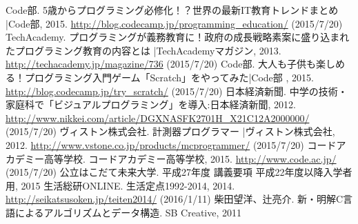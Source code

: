 \documentclass[openany,11pt,papersize]{jsbook}
\begin{document}

\begin{thebibliography}{9}
  Code部. 5歳からプログラミング必修化！？世界の最新IT教育トレンドまとめ |Code部,  2015. \url{http://blog.codecamp.jp/programming_education/} (2015/7/20)
  TechAcademy. プログラミングが義務教育に！政府の成長戦略素案に盛り込まれたプログラミング教育の内容とは |TechAcademyマガジン,  2013. \url{http://techacademy.jp/magazine/736} (2015/7/20)
   Code部. 大人も子供も楽しめる！プログラミング入門ゲーム「Scratch」をやってみた|Code部 ,  2015. \url{http://blog.codecamp.jp/try_scratch/} (2015/7/20)
  日本経済新聞. 中学の技術・家庭科で「ビジュアルプログラミング」を導入:日本経済新聞,  2012. \url{http://www.nikkei.com/article/DGXNASFK2701H_X21C12A2000000/} (2015/7/20)
  ヴィストン株式会社. 計測器プログラマー |ヴィストン株式会社,  2012. \url{http://www.vstone.co.jp/products/mcprogrammer/} (2015/7/20)
   コードアカデミー高等学校. コードアカデミー高等学校,  2015. \url{http://www.code.ac.jp/} (2015/7/20)
 公立はこだて未来大学. 平成27年度 講義要項 平成22年度以降入学者用,  2015
   生活総研ONLINE. 生活定点1992-2014,  2014. \url{http://seikatsusoken.jp/teiten2014/} (2016/1/11)
   柴田望洋、辻亮介. 新・明解C言語によるアルゴリズムとデータ構造. SB Creative, 2011

\end{thebibliography}
\end{document}
